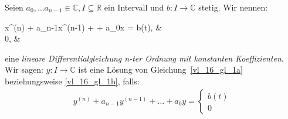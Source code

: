 \begin{Definition}{
	Seien $a_0, \hdots a_{n-1} \in \mathbb{C}, I \subseteq \mathbb{R}$ ein Intervall 
	und $b: I \rightarrow \mathbb{C}$ stetig. Wir nennen:
	\begin{center}
		\begin{subnumcases}{x^{(n)} + a_{n-1}x^{(n-1)} + \hdots + a_0x =}
			b(t), & \label{vl_16_gl_1a} \\
			0, & \label{vl_16_gl_1b}
		\end{subnumcases}
	\end{center}
	eine \emph{lineare Differentialgleichung n-ter Ordnung mit konstanten 
	Koeffizienten}. Wir sagen: $y: I \rightarrow \mathbb{C}$ ist eine Lösung von 
	Gleichung~\ref{vl_16_gl_1a} beziehungsweise \ref{vl_16_gl_1b}, falls:
	\begin{align*}
		y^{(n)} + a_{n-1}y^{(n-1)} + \hdots + a_0y = 
		\begin{cases}
			b(t) \\
			0
		\end{cases}
	\end{align*}
}\end{Definition}

